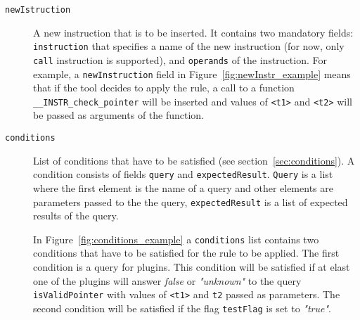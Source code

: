 \begin{description}
    \item[\texttt{newIstruction}] A new instruction that is to be inserted. It
    contains two mandatory fields: \texttt{instruction} that specifies a name
    of the new instruction (for now, only \texttt{call} instruction is
    supported), and \texttt{operands} of the instruction. For example, a
    \texttt{newInstruction} field in Figure~\ref{fig:newInstr_example} means
    that if the tool decides to apply the rule, a call to a function
    \texttt{\_\_INSTR\_check\_pointer} will be inserted and values of
    \texttt{<t1>} and \texttt{<t2>} will be passed as arguments of the
    function.

     \begin{minipage}{\linewidth}
        
        \label{fig:newInstr_example}
      \end{minipage}

    \item[\texttt{conditions}] List of conditions that have to be satisfied
    (see section~\ref{sec:conditions}). A condition consists of fields
    \texttt{query} and \texttt{expectedResult}. \texttt{Query} is a list
    where the first element is the name of a query and other elements are
    parameters passed to the the query, \texttt{expectedResult} is a list of
    expected results of the query.

    In Figure~\ref{fig:conditions_example} a \texttt{conditions} list contains
    two conditions that have to be satisfied for the rule to be applied. The
    first condition is a query for plugins. This condition will be satisfied if
    at elast one of the plugins will answer \emph{false} or \emph{"unknown"} to
    the query \texttt{isValidPointer} with values of \texttt{<t1>} and
    \texttt{t2} passed as parameters. The second condition will be satisfied if
    the flag \texttt{testFlag} is set to \emph{"true"}.

    \begin{minipage}{\linewidth}
        
        \label{fig:conditions_example}
      \end{minipage}


\end{description}
